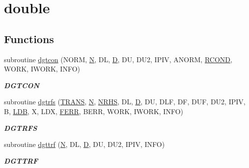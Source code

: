 \hypertarget{group__doubleGTcomputational}{}\section{double}
\label{group__doubleGTcomputational}
\subsection*{Functions}
\begin{DoxyCompactItemize}
\item 
subroutine \hyperlink{group__doubleGTcomputational_ga55242c56fbb3243e6c9b897880182a4b}{dgtcon} (N\+O\+R\+M, \hyperlink{polmisc_8c_a0240ac851181b84ac374872dc5434ee4}{N}, D\+L, \hyperlink{odrpack_8h_a7dae6ea403d00f3687f24a874e67d139}{D}, D\+U, D\+U2, I\+P\+I\+V, A\+N\+O\+R\+M, \hyperlink{superlu__enum__consts_8h_af00a42ecad444bbda75cde1b64bd7e72a9b5c151728d8512307565994c89919d5}{R\+C\+O\+N\+D}, W\+O\+R\+K, I\+W\+O\+R\+K, I\+N\+F\+O)
\begin{DoxyCompactList}\small\item\em {\bfseries D\+G\+T\+C\+O\+N} \end{DoxyCompactList}\item 
subroutine \hyperlink{group__doubleGTcomputational_ga20d15d564aefd2fcd3b19f7511dfe17a}{dgtrfs} (\hyperlink{superlu__enum__consts_8h_a0c4e17b2d5cea33f9991ccc6a6678d62a1f61e3015bfe0f0c2c3fda4c5a0cdf58}{T\+R\+A\+N\+S}, \hyperlink{polmisc_8c_a0240ac851181b84ac374872dc5434ee4}{N}, \hyperlink{example__user_8c_aa0138da002ce2a90360df2f521eb3198}{N\+R\+H\+S}, D\+L, \hyperlink{odrpack_8h_a7dae6ea403d00f3687f24a874e67d139}{D}, D\+U, D\+L\+F, D\+F, D\+U\+F, D\+U2, I\+P\+I\+V, B, \hyperlink{example__user_8c_a50e90a7104df172b5a89a06c47fcca04}{L\+D\+B}, X, L\+D\+X, \hyperlink{superlu__enum__consts_8h_af00a42ecad444bbda75cde1b64bd7e72a78fd14d7abebae04095cfbe02928f153}{F\+E\+R\+R}, B\+E\+R\+R, W\+O\+R\+K, I\+W\+O\+R\+K, I\+N\+F\+O)
\begin{DoxyCompactList}\small\item\em {\bfseries D\+G\+T\+R\+F\+S} \end{DoxyCompactList}\item 
subroutine \hyperlink{group__doubleGTcomputational_ga8ca64e542924cec56cbe9837b77d25b7}{dgttrf} (\hyperlink{polmisc_8c_a0240ac851181b84ac374872dc5434ee4}{N}, D\+L, \hyperlink{odrpack_8h_a7dae6ea403d00f3687f24a874e67d139}{D}, D\+U, D\+U2, I\+P\+I\+V, I\+N\+F\+O)
\begin{DoxyCompactList}\small\item\em {\bfseries D\+G\+T\+T\+R\+F} \end{DoxyCompactList}\item 

\end{DoxyCompactItemize}
